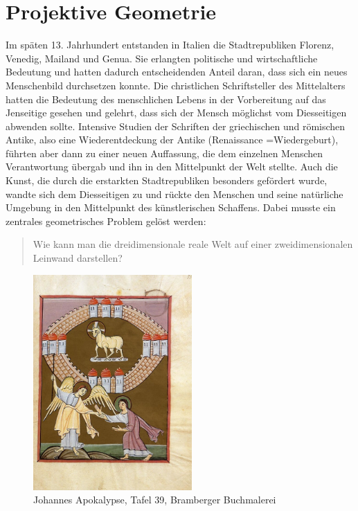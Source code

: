 \documentclass[%
11pt,%
twoside,%
titlepage,%
a4page,%
german,%
headsepline%
]{scrartcl}
\begin{document}
\section{Projektive Geometrie}
Im sp\"aten 13. Jahrhundert entstanden in Italien die Stadtrepubliken Florenz, Venedig, Mailand und Genua. Sie erlangten politische und wirtschaftliche Bedeutung und hatten dadurch entscheidenden Anteil daran, dass sich ein neues Menschenbild durchsetzen konnte. Die christlichen Schriftsteller des Mittelalters hatten die Bedeutung des menschlichen Lebens in der Vorbereitung auf das Jenseitige gesehen und gelehrt, dass sich der Mensch m\"oglichst vom Diesseitigen abwenden sollte. Intensive Studien der Schriften der griechischen und r\"omischen Antike, also eine Wiederentdeckung der Antike (Renaissance =Wiedergeburt), f\"uhrten aber dann zu einer neuen Auffassung, die dem einzelnen Menschen Verantwortung \"ubergab und ihn in den Mittelpunkt der Welt stellte. Auch die Kunst, die durch die erstarkten Stadtrepubliken besonders gef\"ordert wurde, wandte sich dem Diesseitigen zu und r\"uckte den Menschen und seine nat\"urliche Umgebung in den Mittelpunkt des k\"unstlerischen Schaffens. Dabei musste ein zentrales geometrisches Problem gel\"ost werden:

\begin{quote}
Wie kann man die dreidimensionale reale Welt auf einer zweidimensionalen Leinwand darstellen?
\end{quote}

\begin{figure}[h!]
\begin{center}
\includegraphics[width=0.54\textwidth]{pictures/tafel39}
\caption{Johannes Apokalypse, Tafel 39, Bramberger Buchmalerei}
\end{center}
\end{figure}
\end{document}
